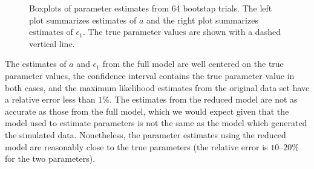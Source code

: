 \begin{figure}
  \centering
  \begin{subfigure}{0.54\textwidth}
  \end{subfigure}
  \hfill
  \begin{subfigure}{0.43\textwidth}
  \end{subfigure}
  \caption[Boxplots of bootstap trials]{Boxplots of parameter
    estimates from 64 bootstap trials. The left plot summarizes estimates
    of $a$ and the right plot summarizes estimates of $\epsilon_1$. The
    true parameter values are shown with a dashed vertical
    line.} 
  \label{fig:bootstraps}
\end{figure}

The estimates of $a$ and $\epsilon_1$ from the full model are well
centered on the true parameter values, the confidence interval
contains the true parameter value in both cases, and the maximum
likelihood estimates from the original data set have a relative error
less than $1\%$. The estimates from the reduced model are not as
accurate as those from the full model, which we would expect given
that the model used to estimate parameters is not the same as the
model which generated the simulated data. Nonetheless, the parameter
estimates using the reduced model are reasonably close to the true
parameters (the relative error is $10$--$20\%$ for the two
parameters). 

